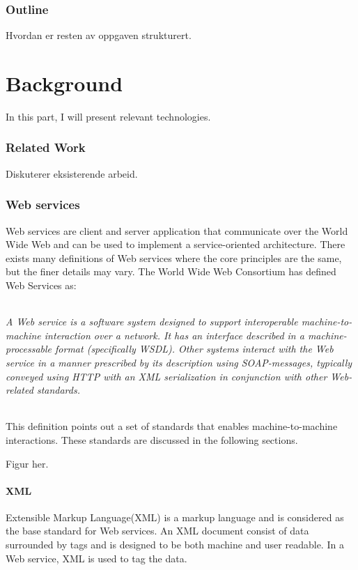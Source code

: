 \documentclass[USenglish]{article}
\begin{document}
\section{Outline}
Hvordan er resten av oppgaven strukturert.


\part{Background}
In this part, I will present relevant technologies.
\section{Related Work}
Diskuterer eksisterende arbeid.



\section{Web services}
\label{web-services}
Web services are client and server application that communicate over the World Wide Web and can be used to implement a service-oriented architecture. There exists many definitions of Web services where the core principles are the same, but the finer details may vary. The World Wide Web Consortium has defined Web Services as\cite{wrc-web-service}:
\paragraph{}
\textit{A Web service is a software system designed to support interoperable machine-to-machine interaction over a network. It has an interface described in a machine-processable format (specifically WSDL). Other systems interact with the Web service in a manner prescribed by its description using SOAP-messages, typically conveyed using HTTP with an XML serialization in conjunction with other Web-related standards.}

\paragraph{}
This definition points out a set of standards that enables machine-to-machine interactions. These standards are discussed in the following sections.

Figur her.

\subsection{XML}
Extensible Markup Language(XML) is a markup language and is considered as the base standard for Web services. An XML document consist of data surrounded by tags and is designed to be both machine and user readable. In a Web service, XML is used to tag the data.
\end{document}
